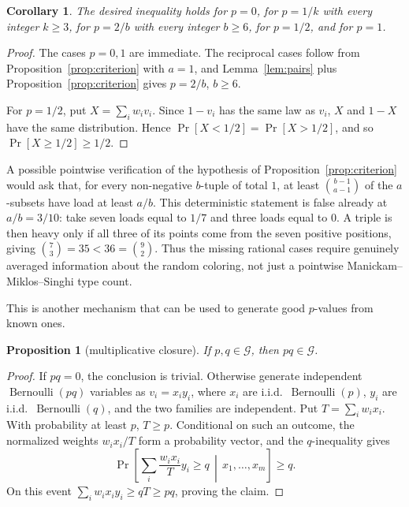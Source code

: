 \documentclass[12pt]{article}
\newtheorem{proposition}{Proposition}
\newtheorem{corollary}{Corollary}
\newcommand{\Ber}{\operatorname{Bernoulli}}
\newcommand{\review}[1]{\begin{reviewbox}#1\end{reviewbox}}
\begin{document}
\begin{corollary}\label{cor:positive}
The desired inequality holds for \(p=0\), for \(p=1/k\) with every integer
\(k\ge3\), for \(p=2/b\) with every integer \(b\ge6\), for \(p=1/2\), and for
\(p=1\).
\end{corollary}

\begin{proof}
The cases \(p=0,1\) are immediate.  The reciprocal cases follow from
Proposition~\ref{prop:criterion} with \(a=1\), and Lemma~\ref{lem:pairs} plus
Proposition~\ref{prop:criterion} gives \(p=2/b\), \(b\ge6\).

For \(p=1/2\), put \(X=\sum_i w_i v_i\).  Since \(1-v_i\) has the same law as
\(v_i\), \(X\) and \(1-X\) have the same distribution.  Hence
\(\Pr[X<1/2]=\Pr[X>1/2]\), and so \(\Pr[X\ge1/2]\ge1/2\).
\end{proof}

A possible pointwise verification of the hypothesis of
Proposition~\ref{prop:criterion} would ask that, for every non-negative
\(b\)-tuple of total \(1\), at least \(\binom{b-1}{a-1}\) of the
\(a\)-subsets have load at least \(a/b\).  This deterministic statement is
false already at \(a/b=3/10\): take seven
loads equal to \(1/7\) and three loads equal to \(0\).  A triple is then heavy
only if all three of its points come from the seven positive positions, giving
\(\binom73=35<36=\binom92\).  Thus the missing rational cases require genuinely
averaged information about the random coloring, not just a pointwise
Manickam--Miklos--Singhi type count.

\review{
This is another mechanism that can be used to generate good $p$-values from known ones.
}
\begin{proposition}[multiplicative closure]\label{prop:closure}
If \(p,q\in\mathcal G\), then \(pq\in\mathcal G\).
\end{proposition}

\begin{proof}
If \(pq=0\), the conclusion is trivial.  Otherwise generate independent
\(\Ber(pq)\) variables as \(v_i=x_i y_i\), where
\(x_i\) are i.i.d.\ \(\Ber(p)\), \(y_i\) are i.i.d.\ \(\Ber(q)\), and the two
families are independent.  Put \(T=\sum_i w_i x_i\).  With probability at least
\(p\), \(T\ge p\).  Conditional on such an outcome, the normalized weights
\(w_i x_i/T\) form a probability vector, and the \(q\)-inequality gives
\[
 \Pr\!\left[\sum_i \frac{w_i x_i}{T}y_i\ge q\,\middle|\,x_1,\ldots,x_m\right]
 \ge q .
\]
On this event \(\sum_i w_i x_i y_i\ge qT\ge pq\), proving the claim.
\end{proof}
\end{document}

